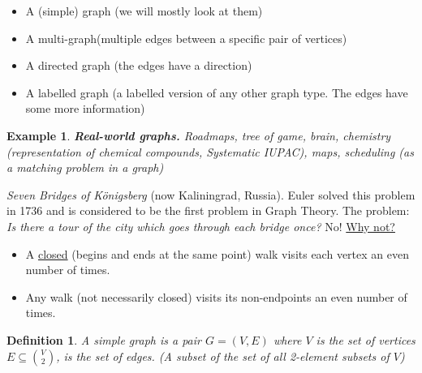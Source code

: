 \documentclass[a4paper]{article}
\theoremstyle{plain}
\newtheorem{definition}[lemma]{Definition}
\theoremstyle{myremark}
\newtheorem{example}[lemma]{Example}
\begin{document}
\begin{itemize}
    \item A (simple) graph (we will mostly look at them)\newline
    \item A multi-graph\newline (multiple edges between a specific pair of vertices)
    \item A directed graph (the edges have a direction)
    \item A labelled graph (a labelled version of any other graph type. The edges have some more information)
\end{itemize}

\begin{example}
{\bf Real-world graphs. }Roadmaps, tree of game, brain, chemistry (representation of chemical compounds, Systematic IUPAC), maps, scheduling (as a \textit{matching problem} in a graph)
\end{example}

\newline
\indent\textit{Seven Bridges of K\"onigsberg} (now Kaliningrad, Russia)\cite{Bridges}. Euler\cite{Euler} solved this problem in 1736 and is considered to  be the first problem in Graph Theory.
\newline
The problem: \textit{Is there a tour of the city which goes through each bridge once?} No!
\newline
\underline{Why not?}
\begin{itemize}
    \item A \underline{closed} (begins and ends at the same point) walk visits each vertex an even number of times.
    \item Any walk (not necessarily closed) visits its non-endpoints an even number of times.
\end{itemize}

\begin{definition}
A simple graph is a pair $G=(V,E)$ where
\newline
$V$ is the set of vertices
\newline
$E \subseteq {V\choose 2}$, is the set of edges. (A subset of the set of all 2-element subsets of $V$)
\end{definition}
\end{document}
